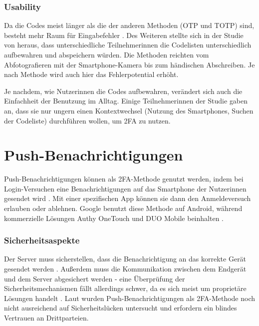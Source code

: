 \subsubsection{Usability}

Da die Codes meist länger als die der anderen Methoden (\ac{OTP} und \ac{TOTP}) sind, besteht mehr Raum für Eingabefehler \parencite{reeseUsabilityStudy2019}. Des Weiteren stellte sich in der Studie von \textcite{reeseUsabilityStudy2019} heraus, dass unterschiedliche Teilnehmerinnen die Codelisten unterschiedlich aufbewahren und abspeichern würden. Die Methoden reichten vom Abfotografieren mit der Smartphone-Kamera bis zum händischen Abschreiben. Je nach Methode wird auch hier das Fehlerpotential erhöht.

Je nachdem, wie Nutzerinnen die Codes aufbewahren, verändert sich auch die Einfachheit der Benutzung im Alltag. Einige Teilnehmerinnen der Studie \parencite{reeseUsabilityStudy2019} gaben an, dass sie nur ungern einen Kontextwechsel (Nutzung des Smartphones, Suchen der Codeliste) durchführen wollen, um \ac{2FA} zu nutzen.

\section{Push-Benachrichtigungen}

Push-Benachrichtigungen können als \ac{2FA}-Methode genutzt werden, indem bei Login-Versuchen eine Benachrichtigungen auf das Smartphone der Nutzerinnen gesendet wird \parencite{reeseUsabilityStudy2019}. Mit einer spezifischen App können sie dann den Anmeldeversuch erlauben oder ablehnen. Google benutzt diese Methode auf Android, während kommerzielle Lösungen Authy OneTouch und DUO Mobile beinhalten \parencite{reeseUsabilityStudy2019}.

\subsubsection{Sicherheitsaspekte}

Der Server muss sicherstellen, dass die Benachrichtigung an das korrekte Gerät gesendet werden \parencite{reeseUsabilityStudy2019}. Außerdem muss die Kommunikation zwischen dem Endgerät und dem Server abgesichert werden - eine Überprüfung der Sicherheitsmechanismen fällt allerdings schwer, da es sich meist um proprietäre Lösungen handelt \parencite{reeseUsabilityStudy2019}. Laut \textcite{reeseUsabilityStudy2019} wurden Push-Benachrichtigungen als \ac{2FA}-Methode noch nicht ausreichend auf Sicherheitslücken untersucht und erfordern ein blindes Vertrauen an Drittparteien.

